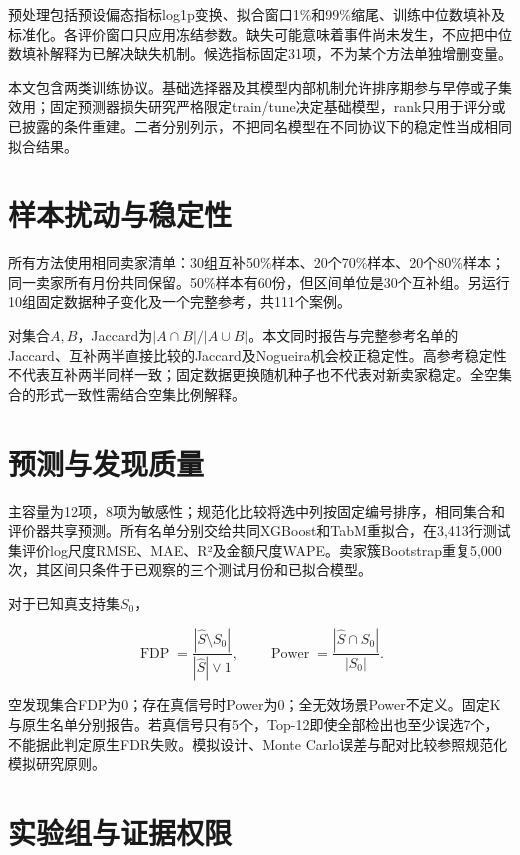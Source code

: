 \documentclass{sufethesismas}
\begin{document}
预处理包括预设偏态指标log1p变换、拟合窗口1\%和99\%缩尾、训练中位数填补及标准化。各评价窗口只应用冻结参数。缺失可能意味着事件尚未发生，不应把中位数填补解释为已解决缺失机制。候选指标固定31项，不为某个方法单独增删变量。

本文包含两类训练协议。基础选择器及其模型内部机制允许排序期参与早停或子集效用；固定预测器损失研究严格限定train/tune决定基础模型，rank只用于评分或已披露的条件重建。二者分别列示，不把同名模型在不同协议下的稳定性当成相同拟合结果。

\section{样本扰动与稳定性}

所有方法使用相同卖家清单：30组互补50\%样本、20个70\%样本、20个80\%样本；同一卖家所有月份共同保留。50\%样本有60份，但区间单位是30个互补组。另运行10组固定数据种子变化及一个完整参考，共111个案例。

对集合\(A,B\)，Jaccard为\(|A\cap B|/|A\cup B|\)。本文同时报告与完整参考名单的Jaccard、互补两半直接比较的Jaccard及Nogueira机会校正稳定性\cite{nogueira2018}。高参考稳定性不代表互补两半同样一致；固定数据更换随机种子也不代表对新卖家稳定。全空集合的形式一致性需结合空集比例解释。

\section{预测与发现质量}

主容量为12项，8项为敏感性；规范化比较将选中列按固定编号排序，相同集合和评价器共享预测。所有名单分别交给共同XGBoost和TabM重拟合，在3,413行测试集评价log尺度RMSE、MAE、R²及金额尺度WAPE。卖家簇Bootstrap重复5,000次，其区间只条件于已观察的三个测试月份和已拟合模型。

对于已知真支持集\(S_0\)，

\[
\operatorname{FDP}=\frac{|\widehat S\setminus S_0|}{|\widehat S|\vee1},
\qquad
\operatorname{Power}=\frac{|\widehat S\cap S_0|}{|S_0|}.
\]

空发现集合FDP为0；存在真信号时Power为0；全无效场景Power不定义。固定K与原生名单分别报告。若真信号只有5个，Top-12即使全部检出也至少误选7个，不能据此判定原生FDR失败。模拟设计、Monte Carlo误差与配对比较参照规范化模拟研究原则\cite{morris2019}。

\section{实验组与证据权限}
\end{document}
